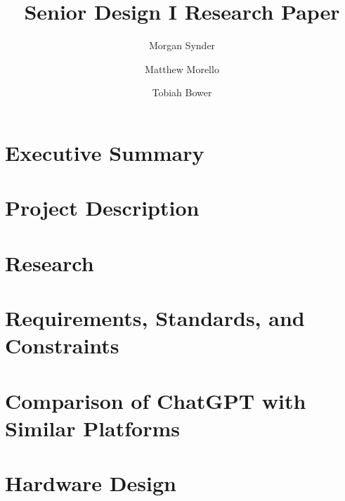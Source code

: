 \documentclass[12pt, letterpaper]{article}
\title{Senior Design I Research Paper}
\author{Morgan Synder \and Matthew Morello \and Tobiah Bower}
\begin{document}
	

	\tableofcontents
	\listoffigures
	\setcounter{secnumdepth}{2}

	\newpage
	\section{Executive Summary}
	
	
	\section{Project Description}
	
	
	
	
	
	
	\section{Research}
	
	
	
	
	
	
	\section{Requirements, Standards, and Constraints}
	
	
	
	
	
	
	

	\section{Comparison of ChatGPT with Similar Platforms}
	
	\section{Hardware Design}
	
\end{document}
